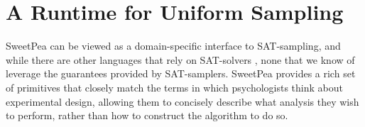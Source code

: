 \section{A Runtime for Uniform Sampling}


SweetPea can be viewed as a domain-specific interface to SAT-sampling, and while there are other languages that rely on SAT-solvers %
, none that we know of leverage the guarantees provided by SAT-samplers. SweetPea provides a rich set of primitives that closely match the terms in which psychologists think about experimental design, allowing them to concisely describe what analysis they wish to perform, rather than how to construct the algorithm to do so.
